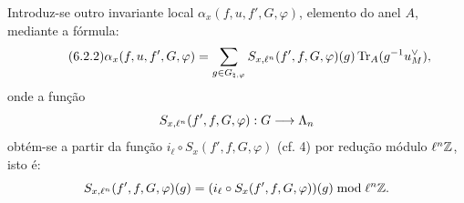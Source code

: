 Introduz-se outro invariante local $\alpha_x(f,u,f',G,\varphi)$, elemento do anel $A$, mediante a fórmula:
\begin{equation}\tag{6.2.2}
\alpha_x(f,u,f',G,\varphi)=
\sum_{g\in G_{\natural,\varphi}}
S_{x,\ell^n}(f',f,G,\varphi)(g)\operatorname{Tr}_A(g^{-1}u_M^\vee),
\end{equation}
onde a função
\[
S_{x,\ell^n}(f',f,G,\varphi):G\longrightarrow\Lambda_n
\]
obtém-se a partir da função $i_\ell\circ S_x(f',f,G,\varphi)$ (cf. 4) por redução módulo $\ell^n\mathbb Z$, isto é:%
\[
S_{x,\ell^n}(f',f,G,\varphi)(g)=
(i_\ell\circ S_x(f',f,G,\varphi))(g)\bmod \ell^n\mathbb Z.
\]
